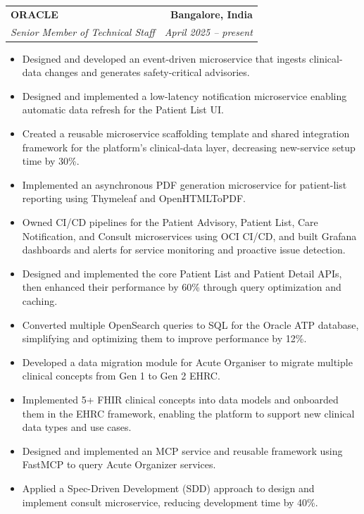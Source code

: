 \documentclass[letterpaper, 11pt]{article}
\makeatletter
\newcommand{\resumeItem}[1]{ \item\small{#1} }
\newcommand{\resumeSubheading}[4]{
\item
\begin{tabular*}{\textwidth}[t]{l@{\extracolsep{\fill}}r}
	\textbf{#1}       & \textbf{\small #2} \\
	\textit{\small#3} & \textit{\small #4} \\
\end{tabular*}
}
\newcommand{\resumeItemListStart}{\begin{itemize}[leftmargin=0.15in, itemsep=1pt, parsep=0pt, topsep=2pt, partopsep=0pt]}
\newcommand{\resumeItemListEnd}{\end{itemize}}
\makeatother
\begin{document}
	\resumeSubheading {ORACLE}{Bangalore, India} {Senior Member of Technical Staff}{April 2025 -- present}
	\resumeItemListStart 
	\resumeItem{Designed and developed an event-driven microservice that ingests clinical-data changes and generates safety-critical advisories.}
	\resumeItem{Designed and implemented a low-latency notification microservice enabling automatic data refresh for the Patient List UI.}
	\resumeItem{Created a reusable microservice scaffolding template and shared integration framework for the platform's clinical-data layer, decreasing new-service setup time by 30\%.}
	\resumeItem{Implemented an asynchronous PDF generation microservice for patient-list reporting using Thymeleaf and OpenHTMLToPDF.}
	\resumeItem{Owned CI/CD pipelines for the Patient Advisory, Patient List, Care Notification, and Consult microservices using OCI CI/CD, and built Grafana dashboards and alerts for service monitoring and proactive issue detection.}
	\resumeItem{Designed and implemented the core Patient List and Patient Detail APIs, then enhanced their performance by 60\% through query optimization and caching.}
	\resumeItem{Converted multiple OpenSearch queries to SQL for the Oracle ATP database, simplifying and optimizing them to improve performance by 12\%.}
	\resumeItem{Developed a data migration module for Acute Organiser to migrate multiple clinical concepts from Gen 1 to Gen 2 EHRC.}
	\resumeItem{Implemented 5+ FHIR clinical concepts into data models and onboarded them in the EHRC framework, enabling the platform to support new clinical data types and use cases.}
	\resumeItem{Designed and implemented an MCP service and reusable framework using FastMCP to query Acute Organizer services.}
	\resumeItem{Applied a Spec-Driven Development (SDD) approach to design and implement consult microservice, reducing development time by 40\%.}
	\resumeItemListEnd
\end{document}
